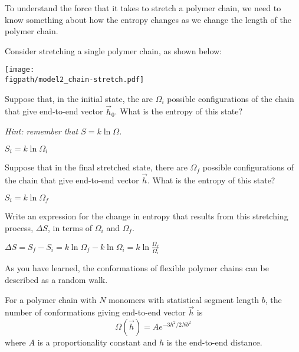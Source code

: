 \begin{activity}
\begin{model}
\label{\labelbase:mdl:chainstretch}
	To understand the force that it takes to stretch a polymer chain, we need to know something about how the entropy changes as we change the length of the polymer chain.
	
	Consider stretching a single polymer chain, as shown below:
	
	\vspace{6pt}
	\centerline{\texttt{[image: \\figpath/model2\_chain-stretch.pdf]}}
\end{model}

\begin{ctqs}
	\question Suppose that, in the initial state, the are $\Omega_i$ possible configurations of the chain that give end-to-end vector $\vec h_0$.  What is the entropy of this state?
	
		\emph{Hint: remember that $S = k\ln\Omega$.}
		
		\begin{solution}[0.25in]
			$S_i = k\ln\Omega_i$
		\end{solution}
	
	\question Suppose that in the final stretched state, there are $\Omega_f$ possible configurations of the chain that give end-to-end vector $\vec h$.  What is the entropy of this state?
		
		\begin{solution}[0.25in]
			$S_i = k\ln\Omega_f$
		\end{solution}
	
	\question Write an expression for the change in entropy that results from this stretching process, $\Delta S$, in terms of $\Omega_i$ and $\Omega_f$. \label{\labelbase:ctq:delS}
		
		\begin{solution}[0.75in]
			$\Delta S = S_f - S_i = k\ln\Omega_f - k\ln\Omega_i = k\ln\frac{\Omega_f}{\Omega_i}$
		\end{solution}
	
\end{ctqs}

\begin{infobox}

	As you have learned, the conformations of flexible polymer chains can be described as a random walk.
	
	For a polymer chain with $N$ monomers with statistical segment length $b$, the number of conformations giving end-to-end vector $\vec h$ is
	\begin{equation*}
		\Omega(\vec h) = A e^{-3h^2/2Nb^2}
	\end{equation*}
	where $A$ is a proportionality constant and $h$ is the end-to-end distance.
	

\end{infobox}
\end{activity}
